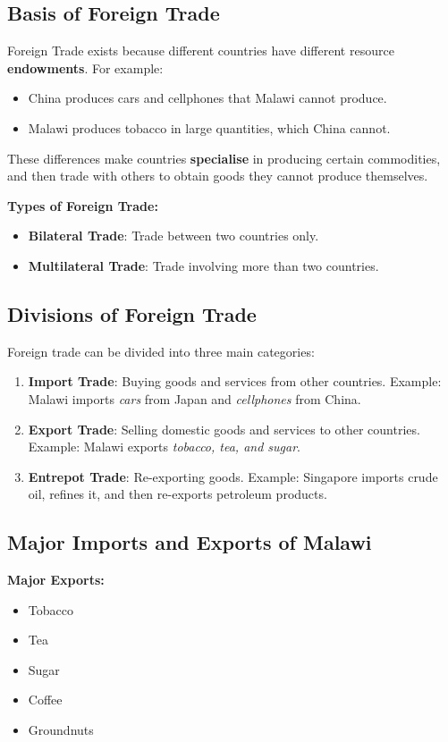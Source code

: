 \documentclass[14pt,a4paper, openany]{book}
\begin{document}
\subsection{Basis of Foreign Trade}
Foreign Trade exists because different countries have different resource \textbf{endowments}.
For example:
\begin{itemize}
	\item China produces cars and cellphones that Malawi cannot produce.
	\item Malawi produces tobacco in large quantities, which China cannot.
\end{itemize}

These differences make countries \textbf{specialise} in producing certain commodities, and then trade with others to obtain goods they cannot produce themselves.

\textbf{Types of Foreign Trade:}
\begin{itemize}
	\item \textbf{Bilateral Trade}: Trade between two countries only.
	\item \textbf{Multilateral Trade}: Trade involving more than two countries.
\end{itemize}

\subsection{Divisions of Foreign Trade}
Foreign trade can be divided into three main categories:

\begin{enumerate}
	\item \textbf{Import Trade}: Buying goods and services from other countries.
	      Example: Malawi imports \textit{cars} from Japan and \textit{cellphones} from China.

	\item \textbf{Export Trade}: Selling domestic goods and services to other countries.
	      Example: Malawi exports \textit{tobacco, tea, and sugar}.

	\item \textbf{Entrepot Trade}: Re-exporting goods.
	      Example: Singapore imports crude oil, refines it, and then re-exports petroleum products.
\end{enumerate}

\subsection{Major Imports and Exports of Malawi}
\textbf{Major Exports:}
\begin{itemize}
	\item Tobacco
	\item Tea
	\item Sugar
	\item Coffee
	\item Groundnuts
\end{itemize}
\end{document}
